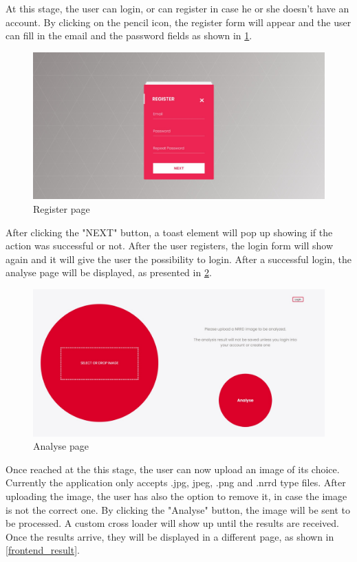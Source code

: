 \documentclass[runningheads,a4paper,11pt]{report}
\begin{document}
 At this stage, the user can login, or can register in case he or she doesn't have an account. By clicking on the pencil icon, the register form will appear and the user can fill in the email and the password fields as shown in \ref{frontend_register}. 

\begin{figure}[h!]
	\centerline{\includegraphics[width=17cm]{images/frontend_register.jpeg}}
	\caption{Register page}
	\label{frontend_register}
\end{figure}

After clicking the "NEXT" button, a toast element will pop up showing if the action was successful or not. After the user registers, the login form will show again and it will give the user the possibility to login. After a successful login, the analyse page will be displayed, as presented in \ref{frontend_analyse}.

\begin{figure}[h!]
	\centerline{\includegraphics[width=17cm]{images/frontend_analyse.jpeg}}
	\caption{Analyse page}
	\label{frontend_analyse}
\end{figure}

Once reached at the this stage, the user can now upload an image of its choice. Currently the application only accepts .jpg, jpeg, .png and .nrrd type files. After uploading the image, the user has also the option to remove it, in case the image is not the correct one. By clicking the "Analyse" button, the image will be sent to be processed. A custom cross loader will show up until the results are received. Once the results arrive, they will be displayed in a different page, as shown in \ref{frontend_result}.
\end{document}
